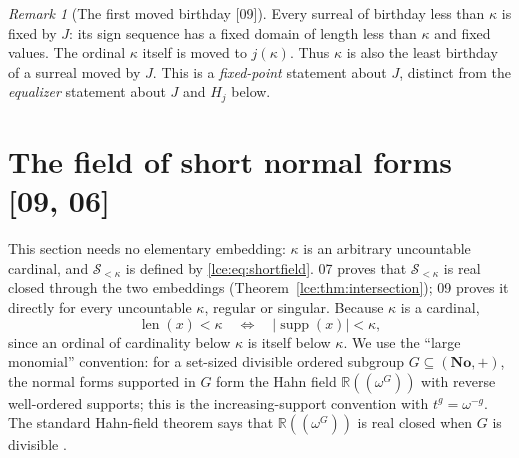 \documentclass[11pt,letterpaper]{article}
\numberwithin{equation}{section}
\theoremstyle{definition}
\theoremstyle{remark}
\newtheorem{remark}[theorem]{Remark}
\newcommand{\No}{\mathbf{No}}
\newcommand{\R}{\mathbb R}
\newcommand{\supp}{\operatorname{supp}}
\newcommand{\len}{\operatorname{len}}
\newcommand{\Sk}{\mathscr S_{<\kappa}}
\newcommand{\imset}[2]{#1\mathbin{``}#2}
\newcommand{\abs}[1]{\lvert#1\rvert}
\newcommand{\set}[1]{\{#1\}}
\newcommand{\thref}[1]{Theorem~\ref{#1}}
\newcommand{\prref}[1]{Proposition~\ref{#1}}
\newcommand{\src}[1]{\textup{\textsf{\small[#1]}}}%
\newcommand{\lbl}[1]{\nolinkurl{#1}}%
\newcommand{\fn}[1]{\nolinkurl{#1}}%
\newcommand{\Hahn}[1]{\R((\omega^{#1}))}
\begin{document}
\noindent[Added 3 October 2026, batch~84: the merged report
\fn{docs/surreal/surreal-self-embeddings} re-proves this proposition
independently, under the same hypothesis, with $\mathcal J_j$ for $J$ (its
source~02: \lbl{sse:pf:thm:large}, with the absoluteness lemma
\lbl{sse:pf:lem:absolute}). Beyond these statements it records that the
ordinal $\kappa$ itself is not in the range of $J$ (properness is
\prref{lce:cs:prop:proper} here, with the omitted point $h_\kappa$) and that
every sign sequence of birthday below $\kappa$ is fixed (as in
Remark~\ref{lce:sg:rem:firstmoved}). It adds a pointwise remark
(\lbl{sse:pf:rem:cutfailure}): $J(\set{L\mid R})=\set{\imset JL\mid\imset JR}$
for all cuts with $\abs L,\abs R<\kappa$, and this fails at the canonical cut
$\kappa=\set{\alpha:\alpha<\kappa\mid\varnothing}$, since every option is
fixed but $J(\kappa)=j(\kappa)>\kappa$; so the least size of a pointwise cut
failure is exactly $\kappa$, the cut-theoretic analogue of
Corollary~\ref{lce:cor:firstfailure}. Its summation defect for
$h_\kappa=\sum_{\alpha<\kappa}\omega^{-\alpha}$ is \thref{lce:thm:witness}.
No result here uses that report.]

\begin{remark}[The first moved birthday \src{09}]\label{lce:sg:rem:firstmoved}
Every surreal of birthday less than $\kappa$ is fixed by $J$: its sign
sequence has a fixed domain of length less than $\kappa$ and fixed values.
The ordinal $\kappa$ itself is moved to $j(\kappa)$. Thus $\kappa$ is also
the least birthday of a surreal moved by $J$. This is a \emph{fixed-point}
statement about $J$, distinct from the \emph{equalizer} statement about $J$
and $H_j$ below.
\end{remark}

\section{The field of short normal forms \src{09, 06}}\label{lce:sg:sec:short}

This section needs no elementary embedding: $\kappa$ is an arbitrary
uncountable cardinal, and $\Sk$ is defined by \eqref{lce:eq:shortfield}.
07 proves that $\Sk$ is real closed through the two embeddings
(\thref{lce:thm:intersection}); 09 proves it directly for every
uncountable $\kappa$, regular or singular. Because $\kappa$ is a cardinal,
\begin{equation}\label{lce:sg:eq:length-card}
 \len(x)<\kappa\quad\Longleftrightarrow\quad \abs{\supp(x)}<\kappa,
\end{equation}
since an ordinal of cardinality below $\kappa$ is itself below $\kappa$. We
use the ``large monomial'' convention: for a set-sized divisible ordered
subgroup $G\subseteq(\No,+)$, the normal forms supported in $G$ form the Hahn
field $\Hahn G$ with reverse well-ordered supports; this is the
increasing-support convention with $t^g=\omega^{-g}$. The standard Hahn-field
theorem says that $\Hahn G$ is real closed when $G$ is divisible
\cite{Conway,Gonshor,Berarducci}.
\end{document}
